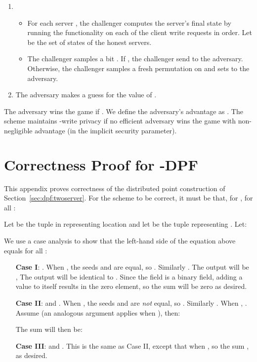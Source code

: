 \documentclass[10pt,twocolumn]{article}
\begin{document}
\begin{enumerate}
  \item \begin{itemize}
        \item For each server , the
        challenger computes the server's final state
         by running the 
        functionality on each of the  client write requests in order.
        Let  be the set of 
        states of the honest servers.

        \item 
        The challenger samples a bit . 
        If , the challenger send  to the adversary.
        Otherwise, the challenger samples a fresh permutation
         on  and sets  to the adversary.

        \end{itemize}
  \item The adversary makes a guess  for the value of .
\end{enumerate}

The adversary wins the game if .
We define the adversary's advantage as
.
The scheme maintains -write privacy if no efficient adversary
wins the game with non-negligible advantage (in the implicit security parameter). 


 \section{Correctness Proof for -DPF}
\label{app:correct}

This appendix proves correctness of the distributed
point construction of Section~\ref{sec:dpf:twoserver}.
For the scheme to be correct,
it must be that, for
, for all :

Let  be the tuple in  representing
location  and let  be the tuple representing .
Let:

We use a case analysis to show that the left-hand side of the 
equation above equals  for all :
\begin{itemize}
\item[{\bf Case I}:] . 
  When , 
  the seeds  and 
  are equal, so .
  Similarly .
  The output  will be
  ,
  The output  will be identical to .
  Since the field is a binary field, adding
  a value to itself results in the zero element,
  so the sum  will be zero as desired.

\item[{\bf Case II}:]  and .
  When , the seeds  and 
  are {\em not} equal, so .
  Similarly .
  When , 
  .
  Assume  (an analogous argument applies when 
  ), then:
  
  The sum  will then be:
  

\item[{\bf Case III}:]  and .
  This is the same as Case II, except that  when
  , so the sum , as desired.

\end{itemize}
\end{document}
